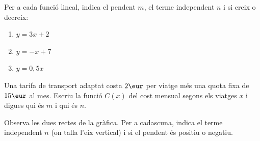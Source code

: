 \begin{exercicis}
\begin{exlist}
  \item Per a cada funció lineal, indica el pendent $m$, el terme independent $n$ i
        si creix o decreix:
    \begin{enumerate}[label=\alph*), leftmargin=1.6em, topsep=2pt]
      \item $y=3x+2$
      \item $y=-x+7$
      \item $y=0,5x$
    \end{enumerate}
  \item Una tarifa de transport adaptat costa $2\eur$ per viatge més una quota fixa
        de $15\eur$ al mes. Escriu la funció $C(x)$ del cost mensual segons els
        viatges $x$ i digues qui és $m$ i qui és $n$.
  \item Observa les dues rectes de la gràfica. Per a cadascuna, indica el terme
        independent $n$ (on talla l'eix vertical) i si el pendent és positiu o negatiu.

        \begin{center}

        \end{center}


\end{exlist}
\end{exercicis}
